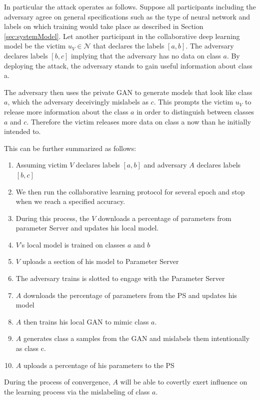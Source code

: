 \documentclass[conference]{IEEEtran}
\begin{document}


In particular the attack operates as follows. Suppose all participants including the adversary agree on general specifications such as
the type of neural network and labels on which training would take place as described in Section \ref{sec:systemModel}. Let another
participant in the collaborative deep learning
model be the victim $u_V\in\mathcal{N}$ that declares the labels $[a,b]$. The adversary declares labels $[b,c]$ implying that the
adversary has no data on class $a$. By deploying the attack, the adversary stands to gain useful information about class a.

The adversary then uses the private GAN to generate models that look like class $a$, which the adversary deceivingly mislabels as $c$.
This prompts the victim  $u_V$ to release more information about the class $a$ in order to distinguish between classes 
$a$ and $c$. Therefore the victim releases more data on class a now than he initially intended to.

This can be further summarized as follows:
\begin {enumerate}
\item Assuming victim $V$ declares labels $[a,b]$ and adversary $A$ declares labels $[b,c]$
\item We then run the collaborative learning protocol for several epoch and stop when we reach a specified accuracy.
\item During this process, the $V$ downloads a percentage of parameters from parameter Server and updates his local model.
\item $V$'s local model is trained on classes $a$ and $b$
\item $V$ uploads a section of his model to Parameter Server
\item The adversary trains is slotted to engage with the Parameter Server
\item $A$ downloads the percentage of parameters from the PS and updates his model
\item $A$ then trains his local GAN to mimic class $a$.
\item $A$ generates class a samples from the GAN and mislabels them intentionally as class c.
\item $A$ uploads a percentage of his parameters to the PS
\end {enumerate}
During the process of convergence, $A$ will be able to covertly exert influence on the learning process via the mislabeling of class
$a$.
\end{document}
